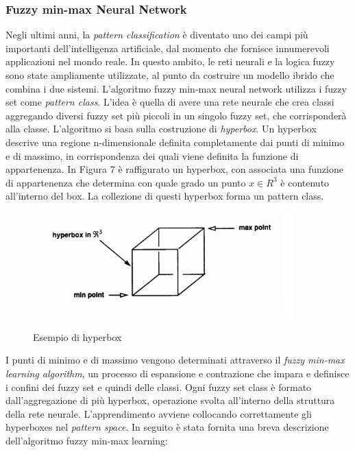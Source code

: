 \documentclass[11pt]{article}
\begin{document}
\subsubsection{Fuzzy min-max Neural Network}

Negli ultimi anni, la \textit{pattern classification} è diventato uno dei campi più importanti dell'intelligenza artificiale, dal momento che fornisce innumerevoli applicazioni nel mondo reale. In questo ambito, le reti neurali e la logica fuzzy sono state ampliamente utilizzate, al punto da costruire un modello ibrido che combina i due sistemi. 
L'algoritmo fuzzy min-max neural network utilizza i fuzzy set come \textit{pattern class}. L'idea è quella di avere una rete neurale che crea classi aggregando diversi fuzzy set più piccoli in un singolo fuzzy set, che corrisponderà alla classe. L'algoritmo si basa sulla costruzione di \textit{hyperbox}. Un hyperbox descrive una regione n-dimensionale definita completamente dai punti di minimo e di massimo, in corrispondenza dei quali viene definita la funzione di appartenenza. In Figura 7 è raffigurato un hyperbox, con associata una funzione di appartenenza che determina con quale grado un punto $x\in R^3$ è contenuto all'interno del box. La collezione di questi hyperbox forma un pattern class. 

\begin{figure}[h!]
\begin{center}
  \includegraphics[width=10cm]{Immagini/hyperbox.png}\\
  \caption{Esempio di hyperbox}
\end{center}
\end{figure}

I punti di minimo e di massimo vengono determinati attraverso il \textit{fuzzy min-max learning algorithm}, un processo di espansione e contrazione che impara e definisce i confini dei fuzzy set e quindi delle classi. Ogni fuzzy set class è formato dall'aggregazione di più hyperbox, operazione svolta all'interno della struttura della rete neurale. L'apprendimento avviene collocando correttamente gli hyperboxes nel \textit{pattern space}. In seguito è stata fornita una breva descrizione dell'algoritmo fuzzy min-max learning: 
\end{document}
